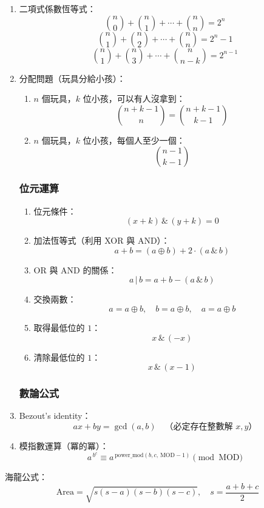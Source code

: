 \begin{enumerate}
\item 二項式係數恆等式：
\[
\binom{n}{0} + \binom{n}{1} + \cdots + \binom{n}{n} = 2^n
\]
\[
\binom{n}{1} + \binom{n}{2} + \cdots + \binom{n}{n} = 2^n - 1
\]
\[
\binom{n}{1} + \binom{n}{3} + \cdots + \binom{n}{n - k} = 2^{n - 1}
\]

\item 分配問題（玩具分給小孩）：
\begin{enumerate}\itemsep = -3pt
\item $n$ 個玩具，$k$ 位小孩，可以有人沒拿到：
\[
\binom{n+k-1}{n} = \binom{n+k-1}{k-1}
\]
\item $n$ 個玩具，$k$ 位小孩，每個人至少一個：
\[
\binom{n-1}{k-1}
\]
\end{enumerate}

\subsubsection{位元運算}
\begin{enumerate}\itemsep = -3pt
\item 位元條件：
\[
(x + k) \,\&\, (y + k) = 0
\]

\item 加法恆等式（利用 XOR 與 AND）：
\[
a + b = (a \oplus b) + 2 \cdot (a \,\&\, b)
\]
\item OR 與 AND 的關係：
\[
a \,|\, b = a + b - (a \,\&\, b)
\]
\item 交換兩數：
\[
a = a \oplus b, \quad b = a \oplus b, \quad a = a \oplus b
\]
\item 取得最低位的 $1$：
\[x \,\&\, (-x)
\]
\item 清除最低位的 $1$：
\[x \,\&\, (x - 1)
\]
\end{enumerate}

\subsubsection{數論公式}
\item Bezout's identity：
\[
ax + by = \gcd(a, b) \quad \text{（必定存在整數解 $x, y$）}
\]

\item 模指數運算（冪的冪）：
\[
a^{\,b^c} \equiv a^{\,\text{power\_mod}(b, c, \, \text{MOD}-1)} \pmod{\text{MOD}}
\]
\end{enumerate}

\item 海龍公式：
\[
\text{Area} = \sqrt{s(s-a)(s-b)(s-c)}, \quad s = \frac{a+b+c}{2}
\]


%